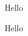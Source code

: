 \documentclass{article}%
\begin{document}
%
\normalsize%
%
Hello%
\begin{adjustbox}{minipage=[s][\pdfpageheight-133px][s]{\pdfpagewidth-90px},precode=\dbox}
Hello
\end{adjustbox}%
\end{document}
